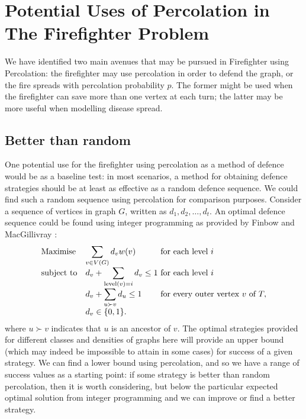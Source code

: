 \documentclass[11pt]{amsart}
\begin{document}
\section{Potential Uses of Percolation in The Firefighter Problem}

We have identified two main avenues that may be pursued in Firefighter using Percolation: the firefighter may use percolation in order to defend the graph, or the fire spreads with percolation probability $p$. The former might be used when the firefighter can save more than one vertex at each turn; the latter may be more useful when modelling disease spread.

\subsection{Better than random}
One potential use for the firefighter using percolation as a method of defence would be as a baseline test: in most scenarios, a method for obtaining defence strategies should be at least as effective as a random defence sequence. We could find such a random sequence using percolation for comparison purposes. Consider a sequence of vertices in graph $G$, written as $d_1, d_2,\dots, d_t$. An optimal defence sequence could be found using integer programming as provided by Finbow and MacGillivray \cite{finbow09}:
\begin{equation*}
\begin{array}{ll@{}ll}
\text{Maximise}  & \displaystyle \sum\limits_{v\in V(G)} d_v w(v) &\text{~for each level~} i\\
\text{subject to}& d_v + \displaystyle\sum\limits_{\text{level}(v)=i} d_v \leq 1  &\text{~for each level~} i\\
				 & d_v + \displaystyle\sum\limits_{u\succ v}  d_u \leq 1  &\text{~for every outer vertex~} v \text{~of~} T,\\
                 &d_{v} \in \{0,1\}. &
\end{array}
\end{equation*}
where $u\succ v$ indicates that $u$ is an ancestor of $v$. The optimal strategies provided for different classes and densities of graphs here will provide an upper bound (which may indeed be impossible to attain in some cases) for success of a given strategy. We can find a lower bound using percolation, and so we have a range of success values as a starting point: if some strategy is better than random percolation, then it is worth considering, but below the particular expected optimal solution from integer programming and we can improve or find a better strategy.\\
\end{document}
